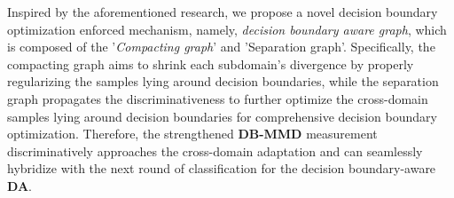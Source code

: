 Inspired by the aforementioned research, we propose a novel decision boundary optimization enforced mechanism, namely, \textit{decision boundary aware graph}, which is composed of the '\textit{Compacting graph}' and 'Separation graph'. Specifically, the compacting graph aims to shrink each subdomain's divergence by properly regularizing the samples lying around decision boundaries, while the separation graph propagates the discriminativeness to further optimize  the cross-domain samples lying around decision boundaries for comprehensive decision boundary optimization. Therefore, the strengthened \textbf{DB-MMD} measurement discriminatively approaches the cross-domain adaptation and can seamlessly hybridize with the next round of classification for the decision boundary-aware \textbf{DA}.